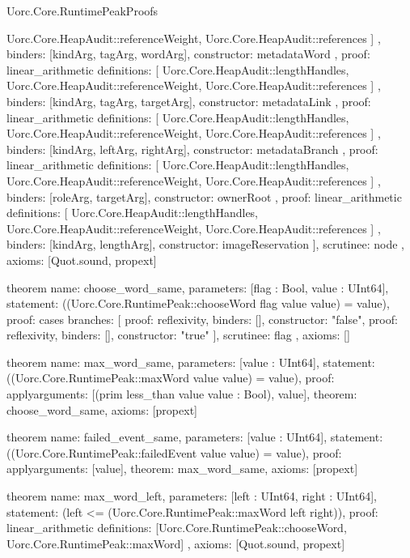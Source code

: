 \begin{lexlean}{Uorc.Core.RuntimePeakProofs}
\begin{semanticmodule}
{{{{            Uorc.Core.HeapAudit::referenceWeight,
            Uorc.Core.HeapAudit::references
          ]
        },
        binders: [kindArg, tagArg, wordArg],
        constructor: metadataWord
      },
      {
        proof: linear_arithmetic{
          definitions: [
            Uorc.Core.HeapAudit::lengthHandles,
            Uorc.Core.HeapAudit::referenceWeight,
            Uorc.Core.HeapAudit::references
          ]
        },
        binders: [kindArg, tagArg, targetArg],
        constructor: metadataLink
      },
      {
        proof: linear_arithmetic{
          definitions: [
            Uorc.Core.HeapAudit::lengthHandles,
            Uorc.Core.HeapAudit::referenceWeight,
            Uorc.Core.HeapAudit::references
          ]
        },
        binders: [kindArg, leftArg, rightArg],
        constructor: metadataBranch
      },
      {
        proof: linear_arithmetic{
          definitions: [
            Uorc.Core.HeapAudit::lengthHandles,
            Uorc.Core.HeapAudit::referenceWeight,
            Uorc.Core.HeapAudit::references
          ]
        },
        binders: [roleArg, targetArg],
        constructor: ownerRoot
      },
      {
        proof: linear_arithmetic{
          definitions: [
            Uorc.Core.HeapAudit::lengthHandles,
            Uorc.Core.HeapAudit::referenceWeight,
            Uorc.Core.HeapAudit::references
          ]
        },
        binders: [kindArg, lengthArg],
        constructor: imageReservation
      }
    ],
    scrutinee: node
  },
  axioms: [Quot.sound, propext]
}

theorem{
  name: choose_word_same,
  parameters: [flag : Bool, value : UInt64],
  statement: ((Uorc.Core.RuntimePeak::chooseWord flag value value) = value),
  proof: cases{
    branches: [
      {proof: reflexivity{}, binders: [], constructor: "false"},
      {proof: reflexivity{}, binders: [], constructor: "true"}
    ],
    scrutinee: flag
  },
  axioms: []
}

theorem{
  name: max_word_same,
  parameters: [value : UInt64],
  statement: ((Uorc.Core.RuntimePeak::maxWord value value) = value),
  proof: apply{arguments: [(prim less_than value value : Bool), value], theorem: choose_word_same},
  axioms: [propext]
}

theorem{
  name: failed_event_same,
  parameters: [value : UInt64],
  statement: ((Uorc.Core.RuntimePeak::failedEvent value value) = value),
  proof: apply{arguments: [value], theorem: max_word_same},
  axioms: [propext]
}

theorem{
  name: max_word_left,
  parameters: [left : UInt64, right : UInt64],
  statement: (left <= (Uorc.Core.RuntimePeak::maxWord left right)),
  proof: linear_arithmetic{
    definitions: [Uorc.Core.RuntimePeak::chooseWord, Uorc.Core.RuntimePeak::maxWord]
  },
  axioms: [Quot.sound, propext]
}


\end{semanticmodule}
\end{lexlean}
